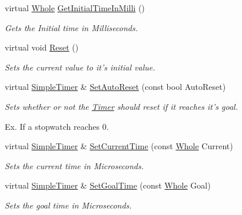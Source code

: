 \begin{DoxyCompactItemize}
virtual \hyperlink{namespacephys_a460f6bc24c8dd347b05e0366ae34f34a}{Whole} \hyperlink{classphys_1_1SimpleTimer_a6ff614afe79f0426c371f67dfe3016fc}{GetInitialTimeInMilli} ()
\begin{DoxyCompactList}\small\item\em Gets the Initial time in Milliseconds. \item\end{DoxyCompactList}\item 
\hypertarget{classphys_1_1SimpleTimer_adea8d8b608e5abb96460c83f7b47f94f}{
virtual void \hyperlink{classphys_1_1SimpleTimer_adea8d8b608e5abb96460c83f7b47f94f}{Reset} ()}
\label{classphys_1_1SimpleTimer_adea8d8b608e5abb96460c83f7b47f94f}

\begin{DoxyCompactList}\small\item\em Sets the current value to it's initial value. \item\end{DoxyCompactList}\item 
virtual \hyperlink{classphys_1_1SimpleTimer}{SimpleTimer} \& \hyperlink{classphys_1_1SimpleTimer_a5a278c256d292a68ffbb35f8db9cb445}{SetAutoReset} (const bool AutoReset)
\begin{DoxyCompactList}\small\item\em Sets whether or not the \hyperlink{classphys_1_1Timer}{Timer} should reset if it reaches it's goal. \par
 Ex. If a stopwatch reaches 0. \item\end{DoxyCompactList}\item 
virtual \hyperlink{classphys_1_1SimpleTimer}{SimpleTimer} \& \hyperlink{classphys_1_1SimpleTimer_a1c874c4e367d582ab0006e7cdb8be0d5}{SetCurrentTime} (const \hyperlink{namespacephys_a460f6bc24c8dd347b05e0366ae34f34a}{Whole} Current)
\begin{DoxyCompactList}\small\item\em Sets the current time in Microseconds. \item\end{DoxyCompactList}\item 
virtual \hyperlink{classphys_1_1SimpleTimer}{SimpleTimer} \& \hyperlink{classphys_1_1SimpleTimer_a09ad426a36971257d2f800075f562eda}{SetGoalTime} (const \hyperlink{namespacephys_a460f6bc24c8dd347b05e0366ae34f34a}{Whole} Goal)
\begin{DoxyCompactList}\small\item\em Sets the goal time in Microseconds. \item\end{DoxyCompactList}\item 

\end{DoxyCompactItemize}

